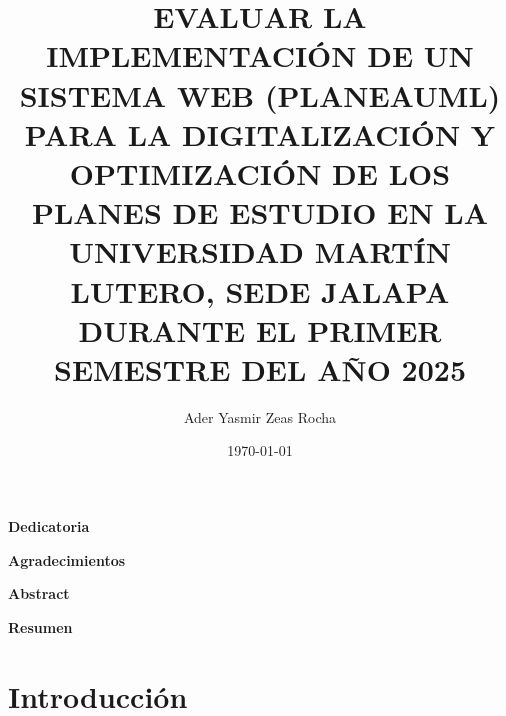 \documentclass[12pt,letterpaper]{article}
\title{EVALUAR LA IMPLEMENTACIÓN DE UN SISTEMA WEB (PLANEAUML) PARA LA DIGITALIZACIÓN Y OPTIMIZACIÓN DE LOS PLANES DE ESTUDIO EN LA UNIVERSIDAD MARTÍN LUTERO, SEDE JALAPA DURANTE EL PRIMER SEMESTRE DEL AÑO 2025}
\author{Ader Yasmir Zeas Rocha}
\date{\today}
\begin{document}
	
	
	
	
	\clearpage
	\begin{center}\bfseries Dedicatoria \end{center}
	\vspace{1cm} %
	
	\clearpage
	\begin{center}\bfseries Agradecimientos \end{center}
	\vspace{1cm}
	
	\clearpage
	\begin{center}\bfseries Abstract \end{center}
	\vspace{1cm}
	
	\clearpage
	\begin{center}\bfseries Resumen \end{center}
	\vspace{1cm}
	
	\clearpage
	\tableofcontents
	
	\clearpage
	
	\setcounter{section}{0} 
	
	
	\section{Introducción}
	
	
\end{document}
